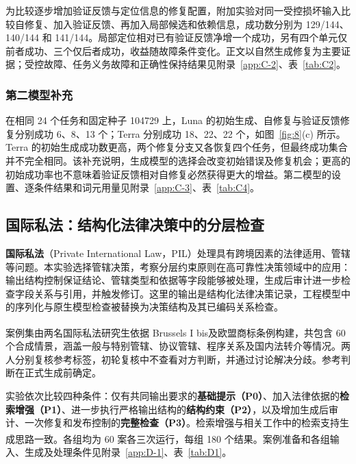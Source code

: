 \documentclass[pdflatex,iicol,sn-mathphys-num]{sn-jnl}
\newcommand{\paperref}[1]{\textsuperscript{\textcolor{citationred}{\citep{#1}}}}
\begin{document}
为比较逐步增加验证反馈与定位信息的修复配置，附加实验对同一受控损坏输入比较自修复、加入验证反馈、再加入局部候选和依赖信息，成功数分别为 129/144、140/144 和 141/144。局部定位相对已有验证反馈净增一个成功，另有四个单元仅前者成功、三个仅后者成功，收益随故障条件变化。正文以自然生成修复为主要证据；受控故障、任务义务故障和正确性保持结果见附录~\ref{app:C-2}、表~\ref{tab:C2}。


\subsubsection{第二模型补充}\label{sec:eval-4-4-3}

在相同 24 个任务和固定种子 104729 上，Luna 的初始生成、自修复与验证反馈修复分别成功 6、8、13 个；Terra 分别成功 18、22、22 个，如图~\ref{fig:8}(c) 所示。Terra 的初始生成成功数更高，两个修复分支又各恢复四个任务，但最终成功集合并不完全相同。该补充说明，生成模型的选择会改变初始错误及修复机会；更高的初始成功率也不意味着验证反馈相对自修复必然获得更大的增益。第二模型的设置、逐条件结果和词元用量见附录~\ref{app:C-3}、表~\ref{tab:C4}。


\subsection{国际私法：结构化法律决策中的分层检查}\label{sec:eval-4-5}

\textbf{国际私法}（Private International Law，PIL）处理具有跨境因素的法律适用、管辖等问题。本实验选择管辖决策，考察分层约束原则在高可靠性决策领域中的应用：输出结构控制保证结论、管辖类型和依据等字段能够被处理，生成后审计进一步检查字段关系与引用，并触发修订。这里的输出是结构化法律决策记录，工程模型中的序列化与原生模型检查被替换为决策结构及其已编码关系检查。


案例集由两名国际私法研究生依据 Brussels I bis\paperref{EU1215_2012_Consolidated20150226}及欧盟商标条例\paperref{EU2017_1001_Consolidated20251201}构建，共包含 60 个合成情景，涵盖一般与特别管辖、协议管辖、程序关系及国内法转介等情况。两人分别复核参考标签，初轮复核中不查看对方判断，并通过讨论解决分歧。参考判断在正式生成前确定。


实验依次比较四种条件：仅有共同输出要求的\textbf{基础提示（P0）}、加入法律依据的\textbf{检索增强（P1）}、进一步执行严格输出结构的\textbf{结构约束（P2）}，以及增加生成后审计、一次修复和发布控制的\textbf{完整检查（P3）}。检索增强与相关工作中的检索支持生成思路一致\paperref{NEURIPS2020_6b493230}。各组均为 60 案各三次运行，每组 180 个结果。案例准备和各组输入、生成及处理条件见附录~\ref{app:D-1}、表~\ref{tab:D1}。
\end{document}
